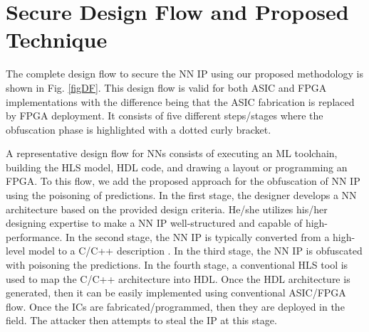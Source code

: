 \documentclass[10pt, twocolumn, conference]{IEEEtran}
\begin{document}

\section{Secure Design Flow and Proposed Technique} \label{sec:VD}

The complete design flow to secure the NN IP using our proposed methodology is shown in Fig. \ref{figDF}. This design flow is valid for both ASIC and FPGA implementations with the difference being that the ASIC fabrication is replaced by FPGA deployment. It consists of five different steps/stages where the obfuscation phase is highlighted with a dotted curly bracket. %

A representative design flow for NNs consists of executing an ML toolchain, building the HLS model, HDL code, and drawing a layout or programming an FPGA. To this flow, we add the proposed approach for the obfuscation of NN IP using the poisoning of predictions. In the first stage, the designer develops a NN architecture based on the provided design criteria. He/she utilizes his/her designing expertise to make a NN IP well-structured and capable of high-performance. %
In the second stage, the NN IP is typically converted from a high-level model to a C/C++ description \cite{rfhls4ml}. In the third stage, the NN IP is obfuscated with poisoning the predictions. In the fourth stage, a conventional HLS tool is used to map the C/C++ architecture into HDL. Once the HDL architecture is generated, then it can be easily implemented using conventional ASIC/FPGA flow. Once the ICs are fabricated/programmed, then they are deployed in the field. The attacker then attempts to steal the IP at this stage.
\end{document}
